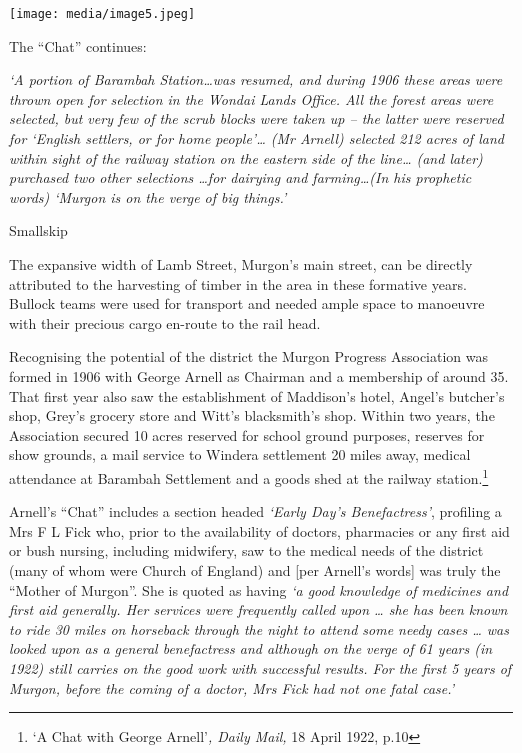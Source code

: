 \texttt{[image: media/image5.jpeg]}

The ``Chat'' continues:

\emph{`A portion of Barambah Station\ldots was resumed, and during 1906 these areas were thrown open for selection in the Wondai Lands Office. All the forest areas were selected, but very few of the scrub blocks were taken up -- the latter were reserved for `English settlers, or for home people'\ldots{} (Mr Arnell) selected 212 acres of land within sight of the railway station on the eastern side of the line\ldots{} (and later) purchased two other selections \ldots for dairying and farming\ldots(In his prophetic words) `Murgon is on the verge of big things.'}

Smallskip

The expansive width of Lamb Street, Murgon's main street, can be directly attributed to the harvesting of timber in the area in these formative years. Bullock teams were used for transport and needed ample space to manoeuvre with their precious cargo en-route to the rail head.

Recognising the potential of the district the Murgon Progress Association was formed in 1906 with George Arnell as Chairman and a membership of around 35. That first year also saw the establishment of Maddison's hotel, Angel's butcher's shop, Grey's grocery store and Witt's blacksmith's shop. Within two years, the Association secured 10 acres reserved for school ground purposes, reserves for show grounds, a mail service to Windera settlement 20 miles away, medical attendance at Barambah Settlement and a goods shed at the railway station.\footnote{`A Chat with George Arnell'\emph{, Daily Mail,} 18 April 1922, p.10}

Arnell's ``Chat'' includes a section headed \emph{`Early Day's Benefactress'}, profiling a Mrs F L Fick who, prior to the availability of doctors, pharmacies or any first aid or bush nursing, including midwifery, saw to the medical needs of the district (many of whom were Church of England) and {[}per Arnell's words{]} was truly the ``Mother of Murgon''. She is quoted as having \emph{`a good knowledge of medicines and first aid generally. Her services were frequently called upon \ldots{} she has been known to ride 30 miles on horseback through the night to attend some needy cases \ldots{} was looked upon as a general benefactress and although on the verge of 61 years (in 1922) still carries on the good work with successful results. For the first 5 years of Murgon, before the coming of a doctor, Mrs Fick had not one fatal case.'}

